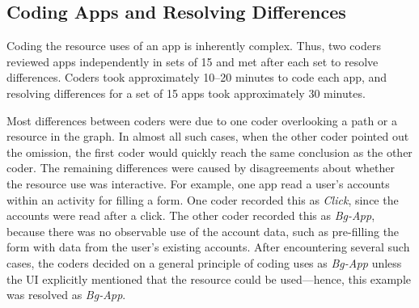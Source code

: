


\subsection{Coding Apps and Resolving Differences}

Coding the resource uses of an app is inherently complex. Thus, two
coders reviewed apps independently in sets of 15 and met after
each set to resolve differences.  Coders took
approximately 10--20 minutes to code each app, and resolving
differences for a set of 15 apps took approximately 30 minutes.

Most differences between coders were due to one coder overlooking
a path or a resource in the \apptracer{} graph.
In almost all such cases, when the other coder pointed
out the omission, the first coder would quickly
reach the same conclusion as the other coder.
%
The remaining differences were caused by disagreements about whether
the resource use was interactive. For example, one app read a user's
accounts within an activity for filling a form. One coder
recorded this as \emph{Click}, since the accounts were read after a
click. The other coder recorded this as \emph{Bg-App}, because there
was no observable use of the account data, such as pre-filling the form with 
data from the user's existing accounts. After encountering several such
cases, the coders decided on a general principle of coding uses as
\emph{Bg-App} unless the UI explicitly mentioned that the resource
could be used---hence, this example was resolved as \emph{Bg-App}.

